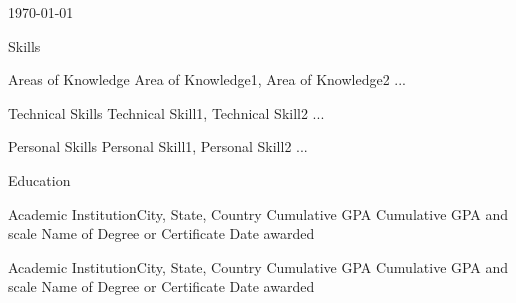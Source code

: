 \documentclass[10pt, letterpaper]{article}
\begin{document}
    
    
    
    
    
    
    \hfill\scriptsize\today

    \begin{profsection}{Skills}
        \begin{profsubsection}{Areas of Knowledge}{}
            Area of Knowledge1, Area of Knowledge2 ...
        \end{profsubsection}
        
        \begin{profsubsection}{Technical Skills}{} 
            Technical Skill1, Technical Skill2 ...
        \end{profsubsection} 
        
        \begin{profsubsection}{Personal Skills}{}
            Personal Skill1, Personal Skill2 ...
        \end{profsubsection}
    \end{profsection}
        
    \begin{profsection}{Education}
        \begin{profsubsection} {Academic Institution}{City, State, Country}   
            Cumulative GPA \hfill Cumulative GPA and scale \newline
            Name of Degree or Certificate \hfill Date awarded
        \end{profsubsection}
        
        \begin{profsubsection} {Academic Institution}{City, State, Country}   
            Cumulative GPA \hfill Cumulative GPA and scale \newline
            Name of Degree or Certificate \hfill Date awarded
        \end{profsubsection}
    \end{profsection}
    
\end{document}
